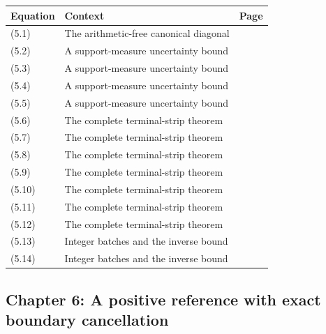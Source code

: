 \documentclass[
  10pt,
  a4paper,
  10pt,
  oneside,
  openany]{book}
\begin{document}
\begin{longtable}[]{@{}llr@{}}
\toprule\noalign{}
Equation & Context & Page \\
\midrule\noalign{}
\endhead
\bottomrule\noalign{}
\endlastfoot
(5.1) & The arithmetic-free canonical diagonal & \pageref{eq:5.1} \\
(5.2) & A support-measure uncertainty bound & \pageref{eq:5.2} \\
(5.3) & A support-measure uncertainty bound & \pageref{eq:5.3} \\
(5.4) & A support-measure uncertainty bound & \pageref{eq:5.4} \\
(5.5) & A support-measure uncertainty bound & \pageref{eq:5.5} \\
(5.6) & The complete terminal-strip theorem & \pageref{eq:5.6} \\
(5.7) & The complete terminal-strip theorem & \pageref{eq:5.7} \\
(5.8) & The complete terminal-strip theorem & \pageref{eq:5.8} \\
(5.9) & The complete terminal-strip theorem & \pageref{eq:5.9} \\
(5.10) & The complete terminal-strip theorem & \pageref{eq:5.10} \\
(5.11) & The complete terminal-strip theorem & \pageref{eq:5.11} \\
(5.12) & The complete terminal-strip theorem & \pageref{eq:5.12} \\
(5.13) & Integer batches and the inverse bound & \pageref{eq:5.13} \\
(5.14) & Integer batches and the inverse bound & \pageref{eq:5.14} \\
\end{longtable}

\subsection{Chapter 6: A positive reference with exact boundary
cancellation}\label{chapter-6-a-positive-reference-with-exact-boundary-cancellation}
\end{document}
